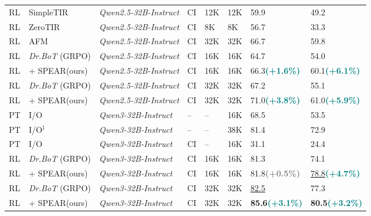\documentclass[]{youtu} %
\newcommand{\method}{\textsc{SPEAR}\xspace}
\begin{document}
\begin{table}[htbp]
{{{\begin{tabular}{llllllll}
RL & SimpleTIR &\textit{Qwen2.5-32B-Instruct}& CI & 12K & 12K & 59.9 & 49.2 \\
RL & ZeroTIR &\textit{Qwen2.5-32B-Instruct}& CI & 8K & 8K & 56.7 &  33.3 \\
RL & AFM &\textit{Qwen2.5-32B-Instruct}& CI & 32K & 32K & 66.7 & 59.8  \\
\rowcolor[gray]{.95}
RL & \textit{Dr.BoT} (GRPO) & \textit{Qwen2.5-32B-Instruct} & CI & 16K & 16K  & 64.7  & 54.0  \\
\rowcolor{c2}
RL  & + \method (ours) & \textit{Qwen2.5-32B-Instruct} & CI & 16K & 16K  &  66.3{\tiny \textbf{\textcolor{teal}{(+1.6\%)}}}  & 60.1{\tiny \textbf{\textcolor{teal}{(+6.1\%)}}} \\
\rowcolor[gray]{.95}
RL & \textit{Dr.BoT} (GRPO) & \textit{Qwen2.5-32B-Instruct} & CI &  32K & 32K  & 67.2  &  55.1  \\
\rowcolor{c2}
RL & + \method (ours) & \textit{Qwen2.5-32B-Instruct} & CI & 32K & 32K & 71.0{\tiny \textbf{\textcolor{teal}{(+3.8\%)}}} & 61.0{\tiny \textbf{\textcolor{teal}{(+5.9\%)}}} \\
\midrule
PT & I/O & \textit{Qwen3-32B-Instruct} & -- & -- & 16K & 68.5  & 53.5  \\
PT & I/O$^\ddagger$ & \textit{Qwen3-32B-Instruct} & -- & -- & 38K & 81.4 & 72.9 \\
PT & I/O & \textit{Qwen3-32B-Instruct} & CI  & --  &  16K  & 31.1 & 24.4 \\
\rowcolor[gray]{.95}
RL & \textit{Dr.BoT} (GRPO) & \textit{Qwen3-32B-Instruct} & CI &  16K  &  16K & 81.3 & 74.1 \\
\rowcolor{c2}
RL & + \method (ours) & \textit{Qwen3-32B-Instruct} & CI & 16K  & 16K  &   81.8{\tiny \textbf{\textcolor{gray}{(+0.5\%)}}}  &  \underline{78.8}{\tiny \textbf{\textcolor{teal}{(+4.7\%)}}} \\
\rowcolor[gray]{.95}
RL & \textit{Dr.BoT} (GRPO) & \textit{Qwen3-32B-Instruct} & CI & 32K & 32K & \underline{82.5} & 77.3 \\
\rowcolor{c2}
RL & + \method (ours) & \textit{Qwen3-32B-Instruct} & CI &  32K  &  32K  &  \textbf{85.6}{\tiny \textbf{\textcolor{teal}{(+3.1\%)}}}  & \textbf{80.5}{\tiny \textbf{\textcolor{teal}{(+3.2\%)}}}  \\
\bottomrule
\end{tabular}
}}}
\end{table}
\end{document}
